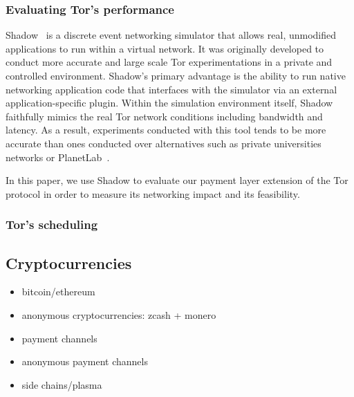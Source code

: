 \subsubsection{Evaluating Tor's performance}
Shadow~\cite{shadow-ndss12} is a discrete event networking simulator that allows
real, unmodified applications to run within a virtual network. It was originally
developed to conduct more accurate and large scale Tor experimentations in a
private and controlled environment. Shadow's primary advantage is the ability to
run native networking application code that interfaces with the simulator via an
external application-specific plugin.   Within the simulation environment itself,
Shadow faithfully mimics the real Tor network conditions including bandwidth and
latency. As a result, experiments conducted with this tool tends to be more
accurate than ones conducted over alternatives such as private universities
networks or PlanetLab~\cite{Chun:2003:POT:956993.956995}.

In this paper, we use Shadow to evaluate our payment layer extension of the Tor
protocol in order to measure its networking impact and its feasibility.
\subsubsection{Tor's scheduling}


\subsection{Cryptocurrencies}



\begin{itemize}
\item bitcoin/ethereum~\cite{nakamoto2008bitcoin}~\cite{wood2014ethereum}
\item anonymous cryptocurrencies: zcash + monero
\item payment channels
\item anonymous payment channels
\item side chains/plasma
\end{itemize}


